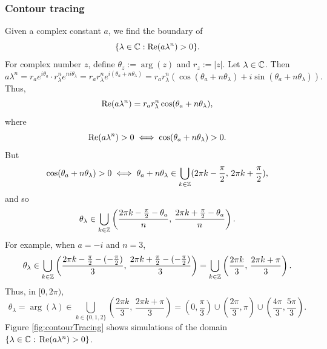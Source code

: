 \documentclass[11pt, oneside, a4paper]{article}
\begin{document}
\subsubsection{Contour tracing}
Given a complex constant $a$, we find the boundary of
\[\{\lambda\in\mathbb C: \mathrm{Re}(a\lambda^n)>0\}.\]
For complex number $z$, define $\theta_z:=\arg(z)$ and $r_z:=|z|$.
Let $\lambda\in\mathbb C$. Then
\[a\lambda^n = r_ae^{i\theta_a}\cdot r_\lambda^n e^{ni\theta_\lambda} = r_a r_\lambda^n e^{i(\theta_a+n\theta_\lambda)} = r_ar_\lambda^n(\cos(\theta_a+n\theta_\lambda) + i\sin(\theta_a+n\theta_\lambda)).\]
Thus,
\[\mathrm{Re}(a\lambda^n) = r_ar_\lambda^n \cos(\theta_a+n\theta_\lambda),\]
where
\[\mathrm{Re}(a\lambda^n)>0 \iff \cos(\theta_a+n\theta_\lambda)>0.\]
But
\[\cos(\theta_a+n\theta_\lambda)>0 \iff \theta_a+n\theta_\lambda\in \bigcup_{k\in\mathbb Z}(2\pi k -\frac{\pi}{2},\,2\pi k + \frac{\pi}{2}),\]
and so
\[\theta_\lambda\in \bigcup_{k\in\mathbb Z}\left(\frac{2\pi k -\frac{\pi}{2}-\theta_a}{n},\,\frac{2\pi k + \frac{\pi}{2}-\theta_a}{n}\right).\]
For example, when $a=-i$ and $n=3$,
\[\theta_\lambda\in \bigcup_{k\in\mathbb Z}\left(\frac{2\pi k -\frac{\pi}{2}-(-\frac{\pi}{2})}{3},\,\frac{2\pi k + \frac{\pi}{2}-(-\frac{\pi}{2})}{3}\right) = \bigcup_{k\in\mathbb Z}\left(\frac{2\pi k}{3},\,\frac{2\pi k + \pi}{3}\right).\]
Thus, in $[0,2\pi)$,
\[\theta_\lambda=\arg(\lambda)\in \bigcup_{k\in\{0,1,2\}}\left(\frac{2\pi k}{3},\,\frac{2\pi k + \pi}{3}\right) = (0,\frac{\pi}{3})\cup (\frac{2\pi}{3}, \pi)\cup (\frac{4\pi}{3}, \frac{5\pi}{3}).\]
Figure \ref{fig:contourTracing} shows simulations of the domain $\{\lambda\in\mathbb C:\,\mathrm{Re}(a\lambda^n)>0\}$.
\end{document}

